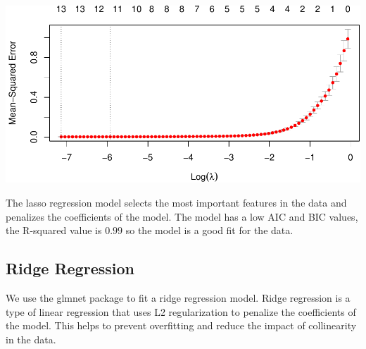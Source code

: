 \documentclass[
]{article}
\newenvironment{Shaded}{\begin{snugshade}}{\end{snugshade}}
\newcommand{\AttributeTok}[1]{\textcolor[rgb]{0.13,0.29,0.53}{#1}}
\newcommand{\CommentTok}[1]{\textcolor[rgb]{0.56,0.35,0.01}{\textit{#1}}}
\newcommand{\ConstantTok}[1]{\textcolor[rgb]{0.56,0.35,0.01}{#1}}
\newcommand{\DecValTok}[1]{\textcolor[rgb]{0.00,0.00,0.81}{#1}}
\newcommand{\FunctionTok}[1]{\textcolor[rgb]{0.13,0.29,0.53}{\textbf{#1}}}
\newcommand{\NormalTok}[1]{#1}
\newcommand{\OtherTok}[1]{\textcolor[rgb]{0.56,0.35,0.01}{#1}}
\newcommand{\SpecialCharTok}[1]{\textcolor[rgb]{0.81,0.36,0.00}{\textbf{#1}}}
\begin{document}
\begin{Shaded}
\end{Shaded}

\begin{center}\includegraphics{Statistical_Learning_Final_Report_files/figure-latex/lasso_regression-1} \end{center}

The lasso regression model selects the most important features in the
data and penalizes the coefficients of the model. The model has a low
AIC and BIC values, the R-squared value is \(0.99\) so the model is a
good fit for the data.

\subsection{Ridge Regression}\label{ridge-regression}

We use the glmnet package to fit a ridge regression model. Ridge
regression is a type of linear regression that uses L2 regularization to
penalize the coefficients of the model. This helps to prevent
overfitting and reduce the impact of collinearity in the data.
\end{document}
